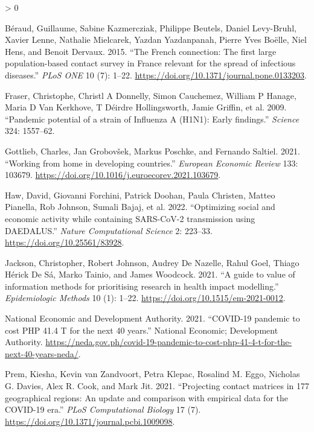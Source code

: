 \documentclass[
]{article}
\newlength{\cslhangindent}
\newenvironment{CSLReferences}[2] %
 {%
  \setlength{\parindent}{0pt}
  \ifodd #1 \everypar{\setlength{\hangindent}{\cslhangindent}}\ignorespaces\fi
  \ifnum #2 > 0
  \setlength{\parskip}{#2\baselineskip}
  \fi
 }%
 {}
\begin{document}
\hypertarget{refs}{}
\begin{CSLReferences}{1}{0}
\leavevmode\hypertarget{ref-Beraud2015}{}%
Béraud, Guillaume, Sabine Kazmercziak, Philippe Beutels, Daniel Levy-Bruhl, Xavier Lenne, Nathalie Mielcarek, Yazdan Yazdanpanah, Pierre Yves Boëlle, Niel Hens, and Benoit Dervaux. 2015. {``{The French connection: The first large population-based contact survey in France relevant for the spread of infectious diseases}.''} \emph{PLoS ONE} 10 (7): 1--22. \url{https://doi.org/10.1371/journal.pone.0133203}.

\leavevmode\hypertarget{ref-Fraser2009}{}%
Fraser, Christophe, Christl A Donnelly, Simon Cauchemez, William P Hanage, Maria D Van Kerkhove, T Déirdre Hollingsworth, Jamie Griffin, et al. 2009. {``{Pandemic potential of a strain of Influenza A (H1N1): Early findings}.''} \emph{Science} 324: 1557--62.

\leavevmode\hypertarget{ref-Gottlieb2021}{}%
Gottlieb, Charles, Jan Grobovšek, Markus Poschke, and Fernando Saltiel. 2021. {``{Working from home in developing countries}.''} \emph{European Economic Review} 133: 103679. \url{https://doi.org/10.1016/j.euroecorev.2021.103679}.

\leavevmode\hypertarget{ref-Haw2020}{}%
Haw, David, Giovanni Forchini, Patrick Doohan, Paula Christen, Matteo Pianella, Rob Johnson, Sumali Bajaj, et al. 2022. {``{Optimizing social and economic activity while containing SARS-CoV-2 transmission using DAEDALUS}.''} \emph{Nature Computational Science} 2: 223--33. \url{https://doi.org/10.25561/83928}.

\leavevmode\hypertarget{ref-Jackson2021}{}%
Jackson, Christopher, Robert Johnson, Audrey De Nazelle, Rahul Goel, Thiago Hérick De Sá, Marko Tainio, and James Woodcock. 2021. {``{A guide to value of information methods for prioritising research in health impact modelling}.''} \emph{Epidemiologic Methods} 10 (1): 1--22. \url{https://doi.org/10.1515/em-2021-0012}.

\leavevmode\hypertarget{ref-NationalEconomicandDevelopmentAuthority2021}{}%
National Economic and Development Authority. 2021. {``{COVID-19 pandemic to cost PHP 41.4 T for the next 40 years}.''} National Economic; Development Authority. \url{https://neda.gov.ph/covid-19-pandemic-to-cost-php-41-4-t-for-the-next-40-years-neda/}.

\leavevmode\hypertarget{ref-Prem2021}{}%
Prem, Kiesha, Kevin van Zandvoort, Petra Klepac, Rosalind M. Eggo, Nicholas G. Davies, Alex R. Cook, and Mark Jit. 2021. {``{Projecting contact matrices in 177 geographical regions: An update and comparison with empirical data for the COVID-19 era}.''} \emph{PLoS Computational Biology} 17 (7). \url{https://doi.org/10.1371/journal.pcbi.1009098}.


\end{CSLReferences}
\end{document}
